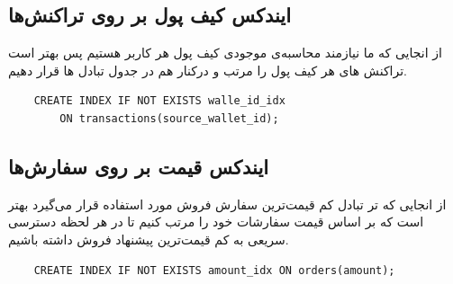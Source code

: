\documentclass{book}
\begin{document}
\subsection{ایندکس کیف پول بر روی تراکنش‌ها}
از انجایی که ما نیازمند محاسبه‌ی موجودی کیف پول هر کاربر هستیم پس بهتر است تراکنش های هر کیف پول را مرتب و درکنار هم در جدول تبادل ها قرار دهیم.

\begin{latin}
    \begin{verbatim}
    CREATE INDEX IF NOT EXISTS walle_id_idx 
        ON transactions(source_wallet_id);
    \end{verbatim}
\end{latin}

\subsection{ایندکس قیمت بر روی سفارش‌ها}
از انجایی که تر تبادل کم قیمت‌ترین سفارش فروش مورد استفاده قرار می‌گیرد بهتر است که بر اساس قیمت سفارشات خود را مرتب کنیم تا در هر لحظه دسترسی سریعی به کم قیمت‌ترین پیشنهاد فروش داشته باشیم.

\begin{latin}
    \begin{verbatim}
    CREATE INDEX IF NOT EXISTS amount_idx ON orders(amount);
    \end{verbatim}
\end{latin}
\end{document}
